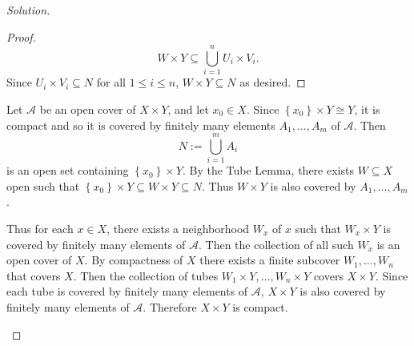 \documentclass[12pt]{article}
\newcommand\setb[1]{\left \{ #1 \right \}}
\theoremstyle{definition}
\begin{document}
\begin{proof}[Solution]
\begin{enumerate}[a)]
\begin{proof}
\[                W \times Y \subseteq \bigcup\limits_{i = 1}^n U_i \times V_i.
            \]
            Since $U_i \times V_i \subseteq N$ for all $1 \leq i \leq n$, $W \times Y \subseteq N$ as desired.
        \end{proof}
        Let $\mathcal{A}$ be an open cover of $X \times Y$, and let $x_0 \in X$. Since $\setb{ x_0 } \times Y \cong Y$, it is compact and so it is covered by finitely many elements $A_1 , \dotsc , A_m$ of $\mathcal{A}$. Then
        \[
            N := \bigcup\limits_{i = 1}^m A_i
        \]
        is an open set containing $\setb{ x_0 } \times Y$. By the Tube Lemma, there exists $W \subseteq X$ open such that $\setb{ x_0 } \times Y \subseteq W \times Y \subseteq N$. Thus $W \times Y$ is also covered by $A_1 , \dotsc , A_m$.
        
        Thus for each $x \in X$, there exists a neighborhood $W_x$ of $x$ such that $W_x \times Y$ is covered by finitely many elements of $\mathcal{A}$. Then the collection of all such $W_x$ is an open cover of $X$. By compactness of $X$ there exists a finite subcover $W_1 , \dotsc , W_n$ that covers $X$. Then the collection of tubes $W_1 \times Y , \dotsc , W_n \times Y$ covers $X \times Y$. Since each tube is covered by finitely many elements of $\mathcal{A}$, $X \times Y$ is also covered by finitely many elements of $\mathcal{A}$. Therefore $X \times Y$ is compact.
    \end{enumerate}
\end{proof}
\end{document}

